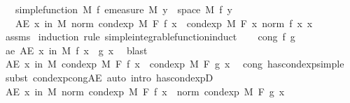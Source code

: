 \begin{isabellebody}
\ \ \ {\isachardoublequoteopen}simple{\isacharunderscore}{\kern0pt}function\ M\ f{\isachardoublequoteclose}\ {\isachardoublequoteopen}emeasure\ M\ {\isacharbraceleft}{\kern0pt}y\ {\isasymin}\ space\ M{\isachardot}{\kern0pt}\ f\ y\ {\isasymnoteq}\ {}{\isacharbraceright}{\kern0pt}\ {\isasymnoteq}\ {\isasyminfinity}{\isachardoublequoteclose}\isanewline
\ \ \ {\isachardoublequoteopen}AE\ x\ in\ M{\isachardot}{\kern0pt}\ norm\ {\isacharparenleft}{\kern0pt}cond{\isacharunderscore}{\kern0pt}exp\ M\ F\ f\ x{\isacharparenright}{\kern0pt}\ {\isasymle}\ cond{\isacharunderscore}{\kern0pt}exp\ M\ F\ {\isacharparenleft}{\kern0pt}{\isasymlambda}x{\isachardot}{\kern0pt}\ norm\ {\isacharparenleft}{\kern0pt}f\ x{\isacharparenright}{\kern0pt}{\isacharparenright}{\kern0pt}\ x{\isachardoublequoteclose}\isanewline
%
\isadelimproof
\ \ %
\endisadelimproof
%
\isatagproof
{}\isamarkupfalse%
\ assms\isanewline
{}\isamarkupfalse%
\ {\isacharparenleft}{\kern0pt}induction\ rule{\isacharcolon}{\kern0pt}\ simple{\isacharunderscore}{\kern0pt}integrable{\isacharunderscore}{\kern0pt}function{\isacharunderscore}{\kern0pt}induct{\isacharparenright}{\kern0pt}\isanewline
\ \ \isamarkupfalse%
\ {\isacharparenleft}{\kern0pt}cong\ f\ g{\isacharparenright}{\kern0pt}\isanewline
\ \ \isamarkupfalse%
\ ae{\isacharcolon}{\kern0pt}\ {\isachardoublequoteopen}AE\ x\ in\ M{\isachardot}{\kern0pt}\ f\ x\ {\isacharequal}{\kern0pt}\ g\ x{\isachardoublequoteclose}\ \isamarkupfalse%
\ blast\isanewline
\ \ \isamarkupfalse%
\ {\isachardoublequoteopen}AE\ x\ in\ M{\isachardot}{\kern0pt}\ cond{\isacharunderscore}{\kern0pt}exp\ M\ F\ f\ x\ {\isacharequal}{\kern0pt}\ cond{\isacharunderscore}{\kern0pt}exp\ M\ F\ g\ x{\isachardoublequoteclose}\ \isamarkupfalse%
\ cong\ has{\isacharunderscore}{\kern0pt}cond{\isacharunderscore}{\kern0pt}exp{\isacharunderscore}{\kern0pt}simple\ \isamarkupfalse%
\ {\isacharparenleft}{\kern0pt}subst\ cond{\isacharunderscore}{\kern0pt}exp{\isacharunderscore}{\kern0pt}cong{\isacharunderscore}{\kern0pt}AE{\isacharparenright}{\kern0pt}\ {\isacharparenleft}{\kern0pt}auto\ intro{\isacharbang}{\kern0pt}{\isacharcolon}{\kern0pt}\ has{\isacharunderscore}{\kern0pt}cond{\isacharunderscore}{\kern0pt}expD{\isacharparenleft}{\kern0pt}{}{\isacharparenright}{\kern0pt}{\isacharparenright}{\kern0pt}\isanewline
\ \ \isamarkupfalse%
\ {\isachardoublequoteopen}AE\ x\ in\ M{\isachardot}{\kern0pt}\ norm\ {\isacharparenleft}{\kern0pt}cond{\isacharunderscore}{\kern0pt}exp\ M\ F\ f\ x{\isacharparenright}{\kern0pt}\ {\isacharequal}{\kern0pt}\ norm\ {\isacharparenleft}{\kern0pt}cond{\isacharunderscore}{\kern0pt}exp\ M\ F\ g\ x{\isacharparenright}{\kern0pt}{\isachardoublequoteclose}\ \isamarkupfalse%

\end{isabellebody}
